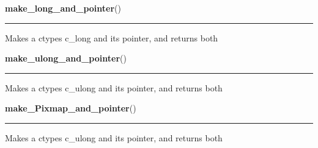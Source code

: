     \label{xformslib:library:make_long_and_pointer}

    \vspace{0.5ex}

\hspace{.8\funcindent}\begin{boxedminipage}{\funcwidth}

    \raggedright \textbf{make\_long\_and\_pointer}()

    \vspace{-1.5ex}

    \rule{\textwidth}{0.5\fboxrule}
\setlength{\parskip}{2ex}

Makes a ctypes c\_long and its pointer, and returns both
\setlength{\parskip}{1ex}
    \end{boxedminipage}

    \label{xformslib:library:make_ulong_and_pointer}

    \vspace{0.5ex}

\hspace{.8\funcindent}\begin{boxedminipage}{\funcwidth}

    \raggedright \textbf{make\_ulong\_and\_pointer}()

    \vspace{-1.5ex}

    \rule{\textwidth}{0.5\fboxrule}
\setlength{\parskip}{2ex}

Makes a ctypes c\_ulong and its pointer, and returns both
\setlength{\parskip}{1ex}
    \end{boxedminipage}

    \label{xformslib:library:make_ulong_and_pointer}

    \vspace{0.5ex}

\hspace{.8\funcindent}\begin{boxedminipage}{\funcwidth}

    \raggedright \textbf{make\_Pixmap\_and\_pointer}()

    \vspace{-1.5ex}

    \rule{\textwidth}{0.5\fboxrule}
\setlength{\parskip}{2ex}

Makes a ctypes c\_ulong and its pointer, and returns both
\setlength{\parskip}{1ex}
    \end{boxedminipage}

